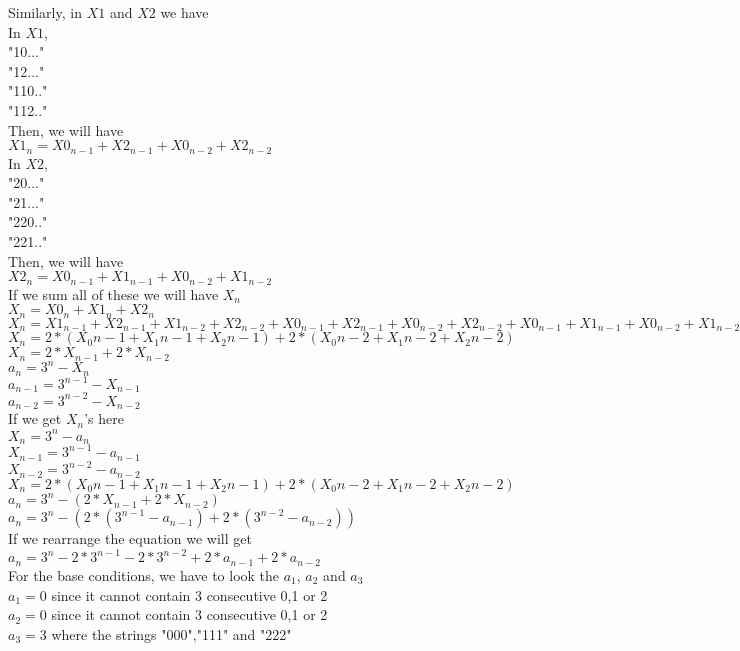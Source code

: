 \documentclass[12pt]{article}
\begin{document}
Similarly, in $X1$ and $X2$ we have \\
In $X1$, \\
"10..." \\
"12..." \\
"110.." \\
"112.." \\
Then, we will have \\
${X1}_n = {X0}_{n-1} + {X2}_{n-1} +{X0}_{n-2} + {X2}_{n-2} $ \\
In $X2$, \\ 
"20..." \\
"21..." \\
"220.." \\
"221.." \\
Then, we will have \\
${X2}_n = {X0}_{n-1} + {X1}_{n-1} +{X0}_{n-2} + {X1}_{n-2} $ \\
If we sum all of these we will have $X_n$ \\
$X_n = {X0}_n+{X1}_n+{X2}_n$ \\
$X_n = {X1}_{n-1} + {X2}_{n-1} +{X1}_{n-2} + {X2}_{n-2}+{X0}_{n-1} + {X2}_{n-1} +{X0}_{n-2} + {X2}_{n-2} +{X0}_{n-1} + {X1}_{n-1} +{X0}_{n-2} + {X1}_{n-2}$ \\
$X_n = 2*({X_0}{n-1}+{X_1}{n-1}+{X_2}{n-1}) +2*({X_0}{n-2}+{X_1}{n-2}+{X_2}{n-2}) $ \\
$X_n = 2* X_{n-1} + 2*X_{n-2}$ \\
$a_n = 3^n - X_n$ \\
$a_{n-1} = 3^{n-1} - X_{n-1}$ \\
$a_{n-2} = 3^{n-2} - X_{n-2}$ \\
If we get $X_n$'s here  \\
$X_n = 3^n - a_n$ \\
$X_{n-1} = 3^{n-1} - a_{n-1}$ \\
$X_{n-2} = 3^{n-2} - a_{n-2}$ \\
$X_n = 2*({X_0}{n-1}+{X_1}{n-1}+{X_2}{n-1}) +2*({X_0}{n-2}+{X_1}{n-2}+{X_2}{n-2}) $
$a_n = 3^n - (2* X_{n-1} + 2*X_{n-2})$ \\
$a_n = 3^n - (2*(3^{n-1} - a_{n-1}) + 2*(3^{n-2} - a_{n-2}))$ \\
If we rearrange the equation we will get \\
$a_n = 3^n - 2*3^{n-1} - 2*3^{n-2} + 2*a_{n-1} + 2*a_{n-2}$ \\
For the base conditions, we have to look the $a_1$, $a_2$ and $a_3$ \\
$a_1 = 0$ since it cannot contain 3 consecutive 0,1 or 2 \\
$a_2 = 0$ since it cannot contain 3 consecutive 0,1 or 2 \\
$a_3 = 3$ where the strings "000","111" and "222"  \\
\end{document}
